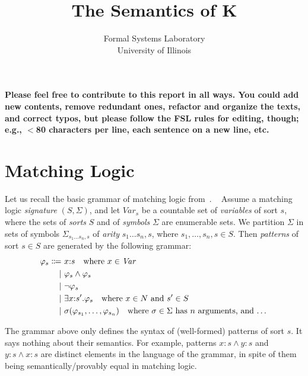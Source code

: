 \documentclass[UTF8]{article}
\title{The Semantics of K}
\author{Formal Systems Laboratory \\
          University of Illinois}
\newcommand{\comment}[1]
    {\par {\bfseries \color{blue} #1 \par}} %
\theoremstyle{plain}
\theoremstyle{definition}
\theoremstyle{remark}
\newcommand{\cln}{{:}}
\begin{document}
\maketitle

\comment{Please feel free to contribute to this report in all ways.
You could add new contents, remove redundant ones, refactor and
organize the texts, and correct typos, but please follow the FSL rules for editing, though; e.g., $<$80 characters per line,
each sentence on a new line, etc. }

\section{Matching Logic}

\newcommand{\Var}{\textit{Var}}
\newcommand{\Nat}{\textit{Nat}}

Let us recall the basic grammar of matching logic
from~\cite{rosu-2017-lmcs}.
~
Assume a matching logic \emph{signature} $(S, \Sigma)$, and
let $\Var_s$ be a countable set of
\emph{variables} of sort $s$, where the sets of \emph{sorts} $S$
and of \emph{symbols} $\Sigma$ are enumerable sets.
We partition $\Sigma$ in sets of symbols
$\Sigma_{s_1 \ldots s_n, s}$ of \emph{arity} $s_1\ldots s_n,s$, where
$s_1,\ldots, s_n, s \in S$.
Then \emph{patterns} of sort $s \in S$ are generated by the following grammar:
\begin{align*}
\varphi_s \Coloneqq\  &x \cln s \quad \text{where $x \in \Var$} \\
\mid\  &\varphi_s \wedge \varphi_s \\
\mid\  &\neg \varphi_s \\
\mid\  &\exists x \cln s' . \varphi_s \quad \text{where $x \in N$ and $s' \in S$} \\
\mid\  &\sigma(\varphi_{s_1},\dots,\varphi_{s_n}) \quad \text{where $\sigma \in \Sigma$ has $n$ arguments, and \dots}
\end{align*}
\begingroup\vspace*{-\baselineskip}
\label{ml-grammar}
\vspace*{\baselineskip}\endgroup

The grammar above only defines the syntax of (well-formed) patterns of sort
$s$.
It says nothing about their semantics.
For example, patterns $x\cln s \wedge y \cln s$ and
$y\cln s \wedge x \cln s$ are distinct elements in the language
of the grammar, in spite of them being semantically/provably equal
in matching logic.
\end{document}
